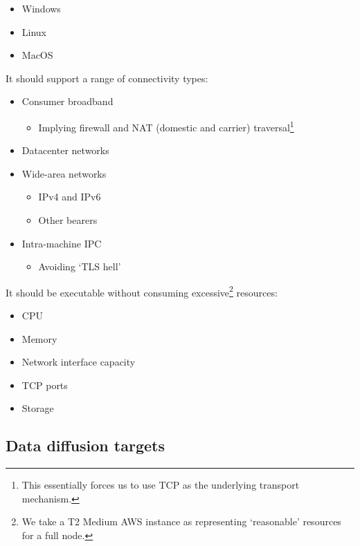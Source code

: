 \documentclass[11pt,a4paper]{article}
\begin{document}
\begin{itemize}
\item
  Windows
\item
  Linux
\item
  MacOS
\end{itemize}

It should support a range of connectivity types:

\begin{itemize}
\item
  Consumer broadband

  \begin{itemize}
  \item
    Implying firewall and NAT (domestic and carrier) traversal\footnote{This
      essentially forces us to use TCP as the underlying transport
      mechanism.}
  \end{itemize}
\item
  Datacenter networks
\item
  Wide-area networks

  \begin{itemize}
  \item
    IPv4 and IPv6
  \item
    Other bearers
  \end{itemize}
\item
  Intra-machine IPC

  \begin{itemize}
  \item
    Avoiding `TLS hell'
  \end{itemize}
\end{itemize}

It should be executable without consuming excessive\footnote{We take a
  T2 Medium AWS instance as representing `reasonable' resources for a
  full node.} resources:

\begin{itemize}
\item
  CPU
\item
  Memory
\item
  Network interface capacity
\item
  TCP ports
\item
  Storage
\end{itemize}

\subsection{Data diffusion targets}
\label{thresholds-and-targets}
\end{document}
